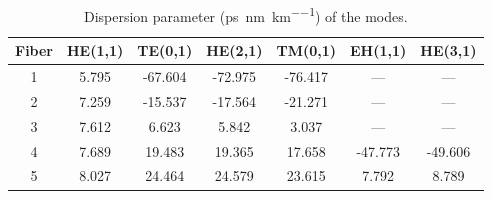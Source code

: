 \begin{table}[!t]
\caption[]{Dispersion parameter (\si{\ps \per \nm \per \km}) of the modes.}
\label{tab:fiberD}
\centering
\begin{tabular}{ccccccc}
Fiber & HE(1,1) & TE(0,1) & HE(2,1) & TM(0,1) & EH(1,1) & HE(3,1) \\
\hline
1 & 5.795 & -67.604 & -72.975 & -76.417 & --- & --- \\
2 & 7.259 & -15.537 & -17.564 & -21.271 & --- & --- \\
3 & 7.612 & 6.623 & 5.842 & 3.037 & --- & --- \\
4 & 7.689 & 19.483 & 19.365 & 17.658 & -47.773 & -49.606 \\
5 & 8.027 & 24.464 & 24.579 & 23.615 & 7.792 & 8.789 \\
\hline
\end{tabular}
\end{table}
